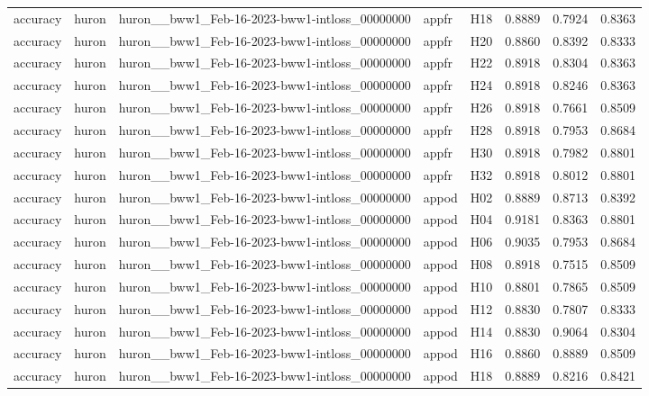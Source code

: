 \begin{table}[tbp]
\begin{tabular}{lllllrrr}
accuracy & huron & huron\_\_bww1\_Feb-16-2023-bww1-intloss\_00000000 & appfr & H18 & 0.8889 & 0.7924 & 0.8363 \\
accuracy & huron & huron\_\_bww1\_Feb-16-2023-bww1-intloss\_00000000 & appfr & H20 & 0.8860 & 0.8392 & 0.8333 \\
accuracy & huron & huron\_\_bww1\_Feb-16-2023-bww1-intloss\_00000000 & appfr & H22 & 0.8918 & 0.8304 & 0.8363 \\
accuracy & huron & huron\_\_bww1\_Feb-16-2023-bww1-intloss\_00000000 & appfr & H24 & 0.8918 & 0.8246 & 0.8363 \\
accuracy & huron & huron\_\_bww1\_Feb-16-2023-bww1-intloss\_00000000 & appfr & H26 & 0.8918 & 0.7661 & 0.8509 \\
accuracy & huron & huron\_\_bww1\_Feb-16-2023-bww1-intloss\_00000000 & appfr & H28 & 0.8918 & 0.7953 & 0.8684 \\
accuracy & huron & huron\_\_bww1\_Feb-16-2023-bww1-intloss\_00000000 & appfr & H30 & 0.8918 & 0.7982 & 0.8801 \\
accuracy & huron & huron\_\_bww1\_Feb-16-2023-bww1-intloss\_00000000 & appfr & H32 & 0.8918 & 0.8012 & 0.8801 \\
accuracy & huron & huron\_\_bww1\_Feb-16-2023-bww1-intloss\_00000000 & appod & H02 & 0.8889 & 0.8713 & 0.8392 \\
accuracy & huron & huron\_\_bww1\_Feb-16-2023-bww1-intloss\_00000000 & appod & H04 & 0.9181 & 0.8363 & 0.8801 \\
accuracy & huron & huron\_\_bww1\_Feb-16-2023-bww1-intloss\_00000000 & appod & H06 & 0.9035 & 0.7953 & 0.8684 \\
accuracy & huron & huron\_\_bww1\_Feb-16-2023-bww1-intloss\_00000000 & appod & H08 & 0.8918 & 0.7515 & 0.8509 \\
accuracy & huron & huron\_\_bww1\_Feb-16-2023-bww1-intloss\_00000000 & appod & H10 & 0.8801 & 0.7865 & 0.8509 \\
accuracy & huron & huron\_\_bww1\_Feb-16-2023-bww1-intloss\_00000000 & appod & H12 & 0.8830 & 0.7807 & 0.8333 \\
accuracy & huron & huron\_\_bww1\_Feb-16-2023-bww1-intloss\_00000000 & appod & H14 & 0.8830 & 0.9064 & 0.8304 \\
accuracy & huron & huron\_\_bww1\_Feb-16-2023-bww1-intloss\_00000000 & appod & H16 & 0.8860 & 0.8889 & 0.8509 \\
accuracy & huron & huron\_\_bww1\_Feb-16-2023-bww1-intloss\_00000000 & appod & H18 & 0.8889 & 0.8216 & 0.8421 \\

\end{tabular}
\end{table}
